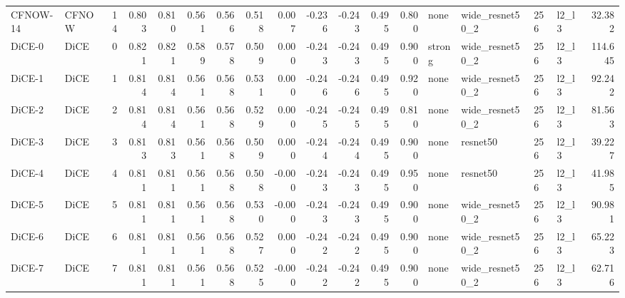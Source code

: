 \begin{tabular}{llrrrrrrrrrrrllllr}
 CFNOW-14 &  CFNOW &     14 &            0.803 &         0.810 &        0.561 &                   0.566 &       0.518 &               0.007 &         -0.236 &            -0.243 &          0.495 &              0.800 &       none & wide\_resnet50\_2 &        256 &  l2\_l3 &       32.382 \\
   DiCE-0 &   DiCE &      0 &            0.821 &         0.821 &        0.589 &                   0.578 &       0.509 &               0.000 &         -0.243 &            -0.243 &          0.495 &              0.900 &     strong & wide\_resnet50\_2 &        256 &  l2\_l3 &      114.645 \\
   DiCE-1 &   DiCE &      1 &            0.814 &         0.814 &        0.561 &                   0.568 &       0.531 &               0.000 &         -0.246 &            -0.246 &          0.495 &              0.920 &       none & wide\_resnet50\_2 &        256 &  l2\_l3 &       92.242 \\
   DiCE-2 &   DiCE &      2 &            0.814 &         0.814 &        0.561 &                   0.568 &       0.529 &               0.000 &         -0.245 &            -0.245 &          0.495 &              0.810 &       none & wide\_resnet50\_2 &        256 &  l2\_l3 &       81.563 \\
   DiCE-3 &   DiCE &      3 &            0.813 &         0.813 &        0.561 &                   0.568 &       0.509 &               0.000 &         -0.244 &            -0.244 &          0.495 &              0.900 &       none &        resnet50 &        256 &  l2\_l3 &       39.227 \\
   DiCE-4 &   DiCE &      4 &            0.811 &         0.811 &        0.561 &                   0.568 &       0.508 &              -0.000 &         -0.243 &            -0.243 &          0.495 &              0.950 &       none &        resnet50 &        256 &  l2\_l3 &       41.985 \\
   DiCE-5 &   DiCE &      5 &            0.811 &         0.811 &        0.561 &                   0.568 &       0.530 &              -0.000 &         -0.243 &            -0.243 &          0.495 &              0.900 &       none & wide\_resnet50\_2 &        256 &  l2\_l3 &       90.981 \\
   DiCE-6 &   DiCE &      6 &            0.811 &         0.811 &        0.561 &                   0.568 &       0.527 &               0.000 &         -0.242 &            -0.242 &          0.495 &              0.900 &       none & wide\_resnet50\_2 &        256 &  l2\_l3 &       65.223 \\
   DiCE-7 &   DiCE &      7 &            0.811 &         0.811 &        0.561 &                   0.568 &       0.525 &              -0.000 &         -0.242 &            -0.242 &          0.495 &              0.900 &       none & wide\_resnet50\_2 &        256 &  l2\_l3 &       62.716 \\
\bottomrule
\end{tabular}
